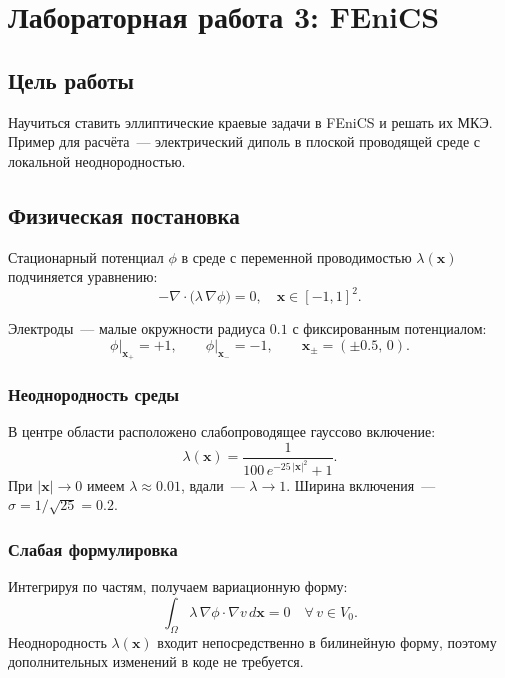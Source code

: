 \section{Лабораторная работа \textnumero{}3: FEniCS}

\subsection{Цель работы}

Научиться ставить эллиптические краевые задачи в FEniCS
и решать их МКЭ. Пример для расчёта~--- электрический диполь
в плоской проводящей среде с локальной неоднородностью.

\subsection{Физическая постановка}

Стационарный потенциал $\phi$ в среде с переменной проводимостью
$\lambda(\mathbf{x})$ подчиняется уравнению:
\begin{equation}\label{eq:strong}
  -\nabla \cdot \bigl(\lambda\,\nabla \phi\bigr) = 0,
  \quad \mathbf{x} \in [-1, 1]^2.
\end{equation}

Электроды~--- малые окружности радиуса $0.1$ с фиксированным потенциалом:
\begin{equation}
  \phi\big|_{\mathbf{x}_+} = +1, \qquad \phi\big|_{\mathbf{x}_-} = -1,
  \qquad \mathbf{x}_\pm = (\pm 0.5,\, 0).
\end{equation}

\subsubsection{Неоднородность среды}

В центре области расположено слабопроводящее гауссово включение:
\begin{equation}\label{eq:lambda}
  \lambda(\mathbf{x}) = \frac{1}{100\,e^{-25\,|\mathbf{x}|^2} + 1}.
\end{equation}
При $|\mathbf{x}| \to 0$ имеем $\lambda \approx 0.01$,
вдали~--- $\lambda \to 1$. Ширина включения~--- $\sigma = 1/\sqrt{25} = 0.2$.

\subsubsection{Слабая формулировка}

Интегрируя по частям, получаем вариационную форму:
\begin{equation}\label{eq:weak}
  \int_\Omega \lambda\,\nabla \phi \cdot \nabla v\,d\mathbf{x} = 0
  \quad \forall\, v \in V_0.
\end{equation}
Неоднородность $\lambda(\mathbf{x})$ входит непосредственно в билинейную
форму, поэтому дополнительных изменений в коде не требуется.

